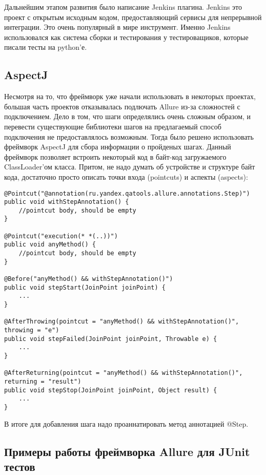 Дальнейшим этапом развития было написание Jenkins плагина. Jenkins это проект с открытым исходным кодом, предоставляющий сервисы для непрерывной интеграции. Это очень популярный в мире инструмент. Именно Jenkins использовался как система сборки и тестирования у тестироващиков, которые писали тесты на python'е.  

\subsection{AspectJ}

Несмотря на то, что фреймворк уже начали использовать в некоторых проектах, большая часть проектов отказывалась подлючать Allure из-за сложностей с подключением. Дело в том, что шаги определялись очень сложным образом, и перевести существующие библиотеки шагов на предлагаемый способ подключения не предоставлялось возможным. Тогда было решено использовать фреймворк AspectJ для сбора информации о пройденых шагах. Данный фреймворк позволяет встроить некоторый код в байт-код загружаемого ClassLoader'ом класса. Притом, не надо думать об устройстве и структуре байт кода, достаточно просто описать  точки входа (pointcuts) и аспекты (aspects): 

\newpage
\begin{lstlisting}[caption=Пример описание точек входа и аспектов.]
@Pointcut("@annotation(ru.yandex.qatools.allure.annotations.Step)")
public void withStepAnnotation() {
    //pointcut body, should be empty
}

@Pointcut("execution(* *(..))")
public void anyMethod() {
    //pointcut body, should be empty
}

@Before("anyMethod() && withStepAnnotation()")
public void stepStart(JoinPoint joinPoint) {
    ...
}

@AfterThrowing(pointcut = "anyMethod() && withStepAnnotation()", throwing = "e")
public void stepFailed(JoinPoint joinPoint, Throwable e) {
    ...
}

@AfterReturning(pointcut = "anyMethod() && withStepAnnotation()", returning = "result")
public void stepStop(JoinPoint joinPoint, Object result) {
    ...
}
\end{lstlisting}


В итоге для добавления шага надо проаннатировать метод аннотацией @Step. 

\newpage
\subsection{Примеры работы фреймворка Allure для JUnit тестов}

